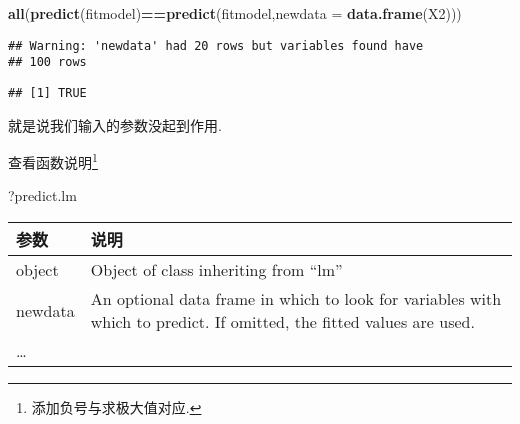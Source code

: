 \documentclass[]{ctexbook}
\newenvironment{Shaded}{\begin{snugshade}}{\end{snugshade}}
\newcommand{\DataTypeTok}[1]{\textcolor[rgb]{0.13,0.29,0.53}{#1}}
\newcommand{\KeywordTok}[1]{\textcolor[rgb]{0.13,0.29,0.53}{\textbf{#1}}}
\newcommand{\NormalTok}[1]{#1}
\newcommand{\OperatorTok}[1]{\textcolor[rgb]{0.81,0.36,0.00}{\textbf{#1}}}
\begin{document}
\begin{Shaded}
\begin{Highlighting}[]
\KeywordTok{all}\NormalTok{(}\KeywordTok{predict}\NormalTok{(fitmodel)}\OperatorTok{==}\KeywordTok{predict}\NormalTok{(fitmodel,}\DataTypeTok{newdata =} \KeywordTok{data.frame}\NormalTok{(X2)))}
\end{Highlighting}
\end{Shaded}

\begin{verbatim}
## Warning: 'newdata' had 20 rows but variables found have
## 100 rows
\end{verbatim}

\begin{verbatim}
## [1] TRUE
\end{verbatim}

就是说我们输入的参数没起到作用.

查看函数说明\footnote{添加负号与求极大值对应.}

\begin{Shaded}
\begin{Highlighting}[]
\NormalTok{?predict.lm}
\end{Highlighting}
\end{Shaded}

\begin{longtable}[]{@{}ll@{}}
\toprule
\begin{minipage}[b]{0.13\columnwidth}\raggedright
参数\strut
\end{minipage} & \begin{minipage}[b]{0.81\columnwidth}\raggedright
说明\strut
\end{minipage}\tabularnewline
\midrule
\endhead
\begin{minipage}[t]{0.13\columnwidth}\raggedright
object\strut
\end{minipage} & \begin{minipage}[t]{0.81\columnwidth}\raggedright
Object of class inheriting from ``lm''\strut
\end{minipage}\tabularnewline
\begin{minipage}[t]{0.13\columnwidth}\raggedright
newdata\strut
\end{minipage} & \begin{minipage}[t]{0.81\columnwidth}\raggedright
An optional data frame in which to look for variables with which to predict. If omitted, the fitted values are used.\strut
\end{minipage}\tabularnewline
\begin{minipage}[t]{0.13\columnwidth}\raggedright
\ldots{}\strut
\end{minipage} & \begin{minipage}[t]{0.81\columnwidth}\raggedright
\strut
\end{minipage}\tabularnewline
\bottomrule
\end{longtable}
\end{document}
